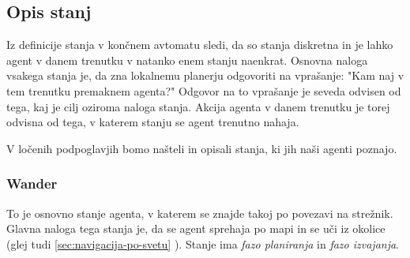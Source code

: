 \documentclass[a4paper,10pt]{article}
\begin{document}
\subsection{Opis stanj}
Iz definicije stanja v končnem avtomatu sledi, da so stanja diskretna in je lahko agent v danem trenutku v natanko enem stanju naenkrat. Osnovna naloga vsakega stanja je, da zna lokalnemu planerju odgovoriti na vprašanje: "Kam naj v tem trenutku premaknem agenta?" Odgovor na to vprašanje je seveda odvisen od tega, kaj je cilj oziroma naloga stanja. Akcija agenta v danem trenutku je torej odvisna od tega, v katerem stanju se agent trenutno nahaja.

V ločenih podpoglavjih bomo našteli in opisali stanja, ki jih naši agenti poznajo.

\subsubsection{Wander}
To je osnovno stanje agenta, v katerem se znajde takoj po povezavi na strežnik. Glavna naloga tega stanja je, da se agent sprehaja po mapi in se uči iz okolice (glej tudi \ref{sec:navigacija-po-svetu} ). Stanje ima \textit{fazo planiranja} in \textit{fazo izvajanja}. 
\end{document}
